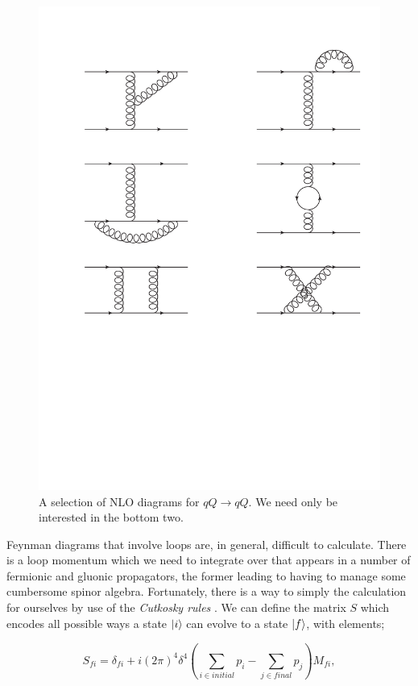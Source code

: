 \begin{figure}[t]
\centering
\includegraphics[scale=0.8]{Images/qQ_nlo.pdf} 
\caption{A selection of NLO diagrams for $qQ \to qQ$. We need only be interested in the bottom two.}
\label{fig:qQnlo}
\end{figure}

Feynman diagrams that involve loops are, in general, difficult to calculate. There is a loop momentum which we need to integrate over that appears in a number of fermionic and gluonic propagators, the former leading to having to manage some cumbersome spinor algebra. Fortunately, there is a way to simply the calculation for ourselves by use of the \emph{Cutkosky rules} \cite{Cutkosky1960}. We can define the matrix $S$ which encodes all possible ways a state $\mathinner{\lvert i\rangle}_{\hspace{-0.1em}}$ can evolve to a state $\mathinner{\lvert f\rangle}_{\hspace{-0.1em}}$, with elements;

\begin{equation}
S_{fi} = \delta_{fi} + i(2 \pi)^4 \delta^4 \left(\sum_{i \in initial} p_i - \sum_{j \in final} p_j \right) M_{fi},
\end{equation}

